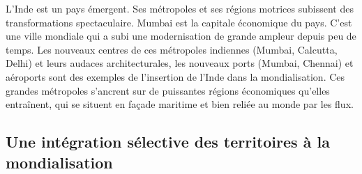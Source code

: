 \documentclass{beamer}
\begin{document}
\begin{frame}
L'Inde est un pays émergent. Ses métropoles et ses régions motrices subissent des transformations spectaculaire. Mumbai est la capitale économique du pays. C'est une ville mondiale qui a subi une modernisation de grande ampleur depuis peu de temps. Les nouveaux centres de ces métropoles indiennes (Mumbai, Calcutta, Delhi) et leurs audaces architecturales, les nouveaux ports (Mumbai, Chennai) et aéroports sont des exemples de l'insertion de l'Inde dans la mondialisation.
Ces grandes métropoles s'ancrent sur de puissantes régions économiques qu'elles entraînent, qui se situent en façade maritime et bien reliée au monde par les flux.

\end{frame}

\subsection{Une intégration sélective des territoires à la mondialisation}



\end{document}
